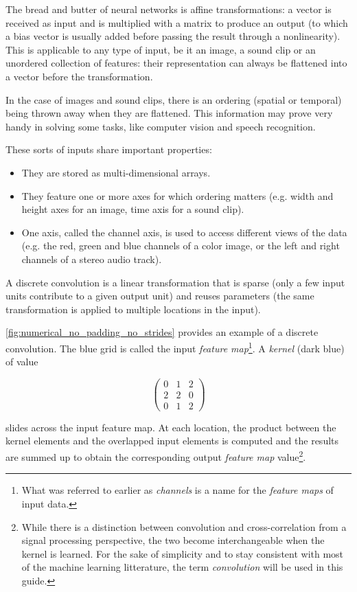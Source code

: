 \documentclass{report}
\begin{document}
The bread and butter of neural networks is affine transformations: a vector is
received as input and is multiplied with a matrix to produce an output (to which
a bias vector is usually added before passing the result through a
nonlinearity). This is applicable to any type of input, be it an image, a sound
clip or an unordered collection of features: their representation can always be
flattened into a vector before the transformation.

In the case of images and sound clips, there is an ordering (spatial or
temporal) being thrown away when they are flattened. This information may prove
very handy in solving some tasks, like computer vision and speech recognition.

These sorts of inputs share important properties:

\begin{itemize}
    \item They are stored as multi-dimensional arrays.
    \item They feature one or more axes for which ordering matters (e.g. width
        and height axes for an image, time axis for a sound clip).
    \item One axis, called the channel axis, is used to access different views
        of the data (e.g. the red, green and blue channels of a color image, or
        the left and right channels of a stereo audio track).
\end{itemize}

A discrete convolution is a linear transformation that is sparse (only a few
input units contribute to a given output unit) and reuses parameters (the same
transformation is applied to multiple locations in the input).

\autoref{fig:numerical_no_padding_no_strides} provides an example of a discrete
convolution. The blue grid is called the input {\em feature map}\footnote{
    What was referred to earlier as {\em channels} is a name for the {\em
    feature maps} of input data.}.
A {\em kernel} (dark blue) of value

\begin{equation}
\begin{pmatrix}
    0 & 1 & 2 \\
    2 & 2 & 0 \\
    0 & 1 & 2
\end{pmatrix}
\end{equation}

slides across the input feature map. At each location, the product between the
kernel elements and the overlapped input elements is computed and the results
are summed up to obtain the corresponding output {\em feature map}
value\footnote{
    While there is a distinction between convolution and cross-correlation from
    a signal processing perspective, the two become interchangeable when the
    kernel is learned. For the sake of simplicity and to stay consistent with
    most of the machine learning litterature, the term {\em convolution}
    will be used in this guide.}.
\end{document}
